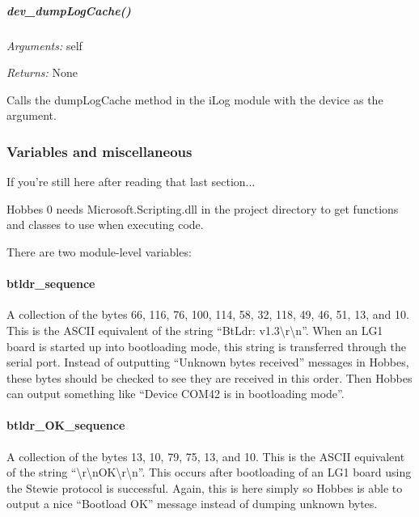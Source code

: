 \documentclass[12pt,letterpaper]{article}
\begin{document}
%
%
\subparagraph{dev\_dumpLogCache()}
\label{4.3.1.3.20}

\emph{Arguments:} self

\emph{Returns:} None

Calls the dumpLogCache method in the iLog module with the device as the argument.


%
%
\subsubsection{Variables and miscellaneous}
\label{4.3.2}

If you're still here after reading that last section...

Hobbes 0 needs Microsoft.Scripting.dll in the project directory to get functions and classes to use when executing code.

There are two module-level variables:

\setcounter{paragraph}{-1}



%
%
\paragraph{btldr\_sequence}
\label{4.3.2.0}

A collection of the bytes 66, 116, 76, 100, 114, 58, 32, 118, 49, 46, 51, 13, and 10. This is the ASCII equivalent of the string ``BtLdr: v1.3\textbackslash r\textbackslash n''. When an LG1 board is started up into bootloading mode, this string is transferred through the serial port. Instead of outputting ``Unknown bytes received'' messages in Hobbes, these bytes should be checked to see they are received in this order. Then Hobbes can output something like ``Device COM42 is in bootloading mode''.



%
%
\paragraph{btldr\_OK\_sequence}
\label{4.3.2.1}

A collection of the bytes 13, 10, 79, 75, 13, and 10. This is the ASCII equivalent of the string ``\textbackslash r\textbackslash nOK\textbackslash r\textbackslash n''. This occurs after bootloading of an LG1 board using the Stewie protocol is successful. Again, this is here simply so Hobbes is able to output a nice ``Bootload OK'' message instead of dumping unknown bytes.
\end{document}

